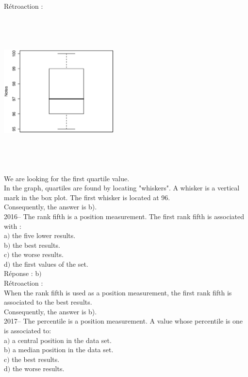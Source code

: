\documentclass[letterpaper, 12pt]{article}
\begin{document}
R\'etroaction :
\begin{center}
 \includegraphics[width=6cm,height=8cm,angle=-90]{Q2015.eps}
\end{center}
We are looking for the first quartile value.\\
In the graph, quartiles are found by locating "whiskers". A whisker is a vertical mark in the box plot. The first whisker is located at 96.\\
Consequently, the answer is b).\\


2016-- The rank fifth is a position measurement. The first rank fifth is associated with :\\

a$)$ the five lower results.\\
b$)$ the best results.\\
c$)$ the worse results.\\
d$)$ the first values of the set.\\

R\'eponse : b$)$\\

R\'etroaction :\\
When the rank fifth is used as a position measurement, the first rank fifth is associated to the best results.\\
Consequently, the answer is b).\\

2017-- The percentile is a position measurement. A value whose percentile is one is associated to: \\

a$)$ a central position in the data set.\\
b$)$ a median position in the data set.\\
c$)$ the best results.\\
d$)$ the worse results.\\
\end{document}
